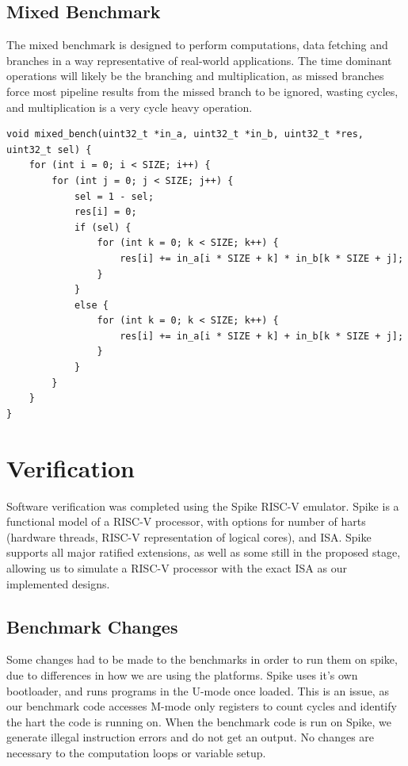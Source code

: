 \subsection{Mixed Benchmark}
The mixed benchmark is designed to perform computations, data fetching and branches in a way representative of real-world applications. The time dominant operations will likely be the branching and multiplication, as missed branches force most pipeline results from the missed branch to be ignored, wasting cycles, and multiplication is a very cycle heavy operation.

\begin{verbatim}
void mixed_bench(uint32_t *in_a, uint32_t *in_b, uint32_t *res, uint32_t sel) {
    for (int i = 0; i < SIZE; i++) {
        for (int j = 0; j < SIZE; j++) {
            sel = 1 - sel;
            res[i] = 0;
            if (sel) {
                for (int k = 0; k < SIZE; k++) {
                    res[i] += in_a[i * SIZE + k] * in_b[k * SIZE + j];
                }
            }
            else {
                for (int k = 0; k < SIZE; k++) {
                    res[i] += in_a[i * SIZE + k] + in_b[k * SIZE + j];
                }
            }
        }
    }
}
\end{verbatim}

\section{Verification}
Software verification was completed using the Spike RISC-V emulator. Spike is a functional model of a RISC-V processor, with options for number of harts (hardware threads, RISC-V representation of logical cores), and ISA. Spike supports all major ratified extensions, as well as some still in the proposed stage, allowing us to simulate a RISC-V processor with the exact ISA as our implemented designs.

\subsection{Benchmark Changes}
Some changes had to be made to the benchmarks in order to run them on spike, due to differences in how we are using the platforms. Spike uses it's own bootloader, and runs programs in the U-mode once loaded. This is an issue, as our benchmark code accesses M-mode only registers to count cycles and identify the hart the code is running on. When the benchmark code is run on Spike, we generate illegal instruction errors and do not get an output. No changes are necessary to the computation loops or variable setup.

